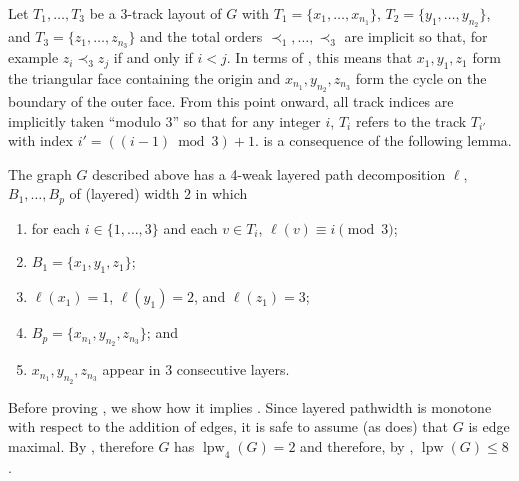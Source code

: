 \documentclass{patmorin}
\DeclareMathOperator{\lpw}{lpw}
\begin{document}
Let $T_1,\ldots,T_3$ be a 3-track layout of $G$ with
$T_1=\{x_1,\ldots,x_{n_1}\}$, $T_2=\{y_1,\ldots,y_{n_2}\}$, and
$T_3=\{z_1,\ldots,z_{n_3}\}$ and the total orders $\prec_1,\ldots,\prec_3$
are implicit so that, for example $z_i\prec_3 z_j$ if and only if $i<j$.
In terms of , this means that $x_1,y_1,z_1$ form
the triangular face containing the origin and $x_{n_1},y_{n_2},z_{n_3}$
form the cycle on the boundary of the outer face.
From this point onward, all track indices are implicitly taken ``modulo 3''
so that for any integer $i$, $T_i$ refers to the track $T_{i'}$ with
index $i'=((i-1)\bmod 3)+1$.   is a consequence of the
following lemma.

\begin{lem}
  The graph $G$ described above has a 4-weak layered path decomposition
  $\ell$, $B_1,\ldots,B_p$ of (layered) width $2$ in which 
  \begin{enumerate}
    \item for each $i\in\{1,\ldots,3\}$ and each $v\in T_i$,
      $\ell(v)\equiv i\pmod 3$;
    \item $B_1=\{x_1,y_1,z_1\}$;
    \item $\ell(x_1)=1$, $\ell(y_1)=2$, and $\ell(z_1)=3$;
    \item $B_p=\{x_{n_1},y_{n_2},z_{n_3}\}$; and
    \item $x_{n_1},y_{n_2},z_{n_3}$ appear in 3 consecutive layers.
  \end{enumerate}
\end{lem}

Before proving , we show how it implies .
Since layered pathwidth is monotone with respect to the addition of edges,
it is safe to assume (as  does) that $G$ is edge maximal.
By , therefore $G$ has $\lpw_4(G)=2$ and therefore, by
, $\lpw(G)\le 8$.
\end{document}
